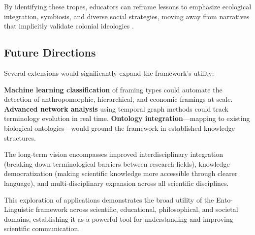 \documentclass[
]{article}
\numberwithin{equation}{section}
\begin{document}
By identifying these tropes, educators can reframe lessons to emphasize
ecological integration, symbiosis, and diverse social strategies, moving
away from narratives that implicitly validate colonial ideologies
\cite{laciny2024terminology}.

\subsection{Future Directions}\label{future-directions-2}

Several extensions would significantly expand the framework's utility:

\textbf{Machine learning classification} of framing types could automate
the detection of anthropomorphic, hierarchical, and economic framings at
scale. \textbf{Advanced network analysis} using temporal graph methods
could track terminology evolution in real time. \textbf{Ontology
integration}---mapping to existing biological ontologies---would ground
the framework in established knowledge structures.

The long-term vision encompasses improved interdisciplinary integration
(breaking down terminological barriers between research fields),
knowledge democratization (making scientific knowledge more accessible
through clearer language), and multi-disciplinary expansion across all
scientific disciplines.

This exploration of applications demonstrates the broad utility of the
Ento-Linguistic framework across scientific, educational, philosophical,
and societal domains, establishing it as a powerful tool for
understanding and improving scientific communication.

\newpage


\end{document}
